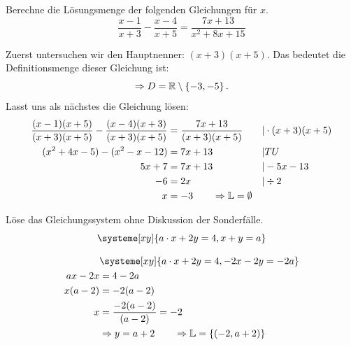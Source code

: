 \documentclass[12pt]{exam}
\begin{document}
\begin{questions}
{\begin{solution}
\end{solution}}
{\vspace{7pt}\newpage}


\question[3]
Berechne die Lösungsmenge der folgenden Gleichungen für $x$.
\[\frac{x-1}{x+3}-\frac{x-4}{x+5}=\frac{7x+13}{x^2+8x+15}\]
{\begin{solution}
		Zuerst untersuchen wir den Hauptnenner: $(x+3)(x+5)$. Das bedeutet die Definitionsmenge dieser Gleichung ist: \[\Rightarrow D=\mathbb{R}\setminus\left\{-3,-5\right\}.\] Lasst uns als nächstes die Gleichung lösen:
		\begin{align*}
			\frac{(x-1)(x+5)}{(x+3)(x+5)}-\frac{(x-4)(x+3)}{(x+3)(x+5)}&=\frac{7x+13}{(x+3)(x+5)} &&\vert\cdot(x+3)(x+5)\\
			(x^2+4x-5)-(x^2-x-12)&=7x+13 &&\vert TU\\
			5x+7&=7x+13&& \vert-5x-13\\
			-6&=2x &&\vert\div 2\\
			x&=-3 \qquad\Rightarrow \mathbb{L}=\emptyset
		\end{align*}
\end{solution}}
{\newpage}


\question[4]
Löse das Gleichungssystem ohne Diskussion der Sonderfälle.
\[\systeme[xy]{a\*x+2y=4,x+y=a}\]
{\begin{solution}
		\begin{align*}
			&\systeme[xy]{a\*x+2y=4,-2x-2y=-2a}\\
			ax-2x&=4-2a\\
			x(a-2)&=-2(a-2)\\
			x&=\frac{-2(a-2)}{(a-2)}=-2\\
			&\Rightarrow y=a+2 \qquad\Rightarrow \mathbb{L}=\left\{(-2,a+2)\right\}
		\end{align*}
\end{solution}}
{}

\end{questions}
\end{document}
